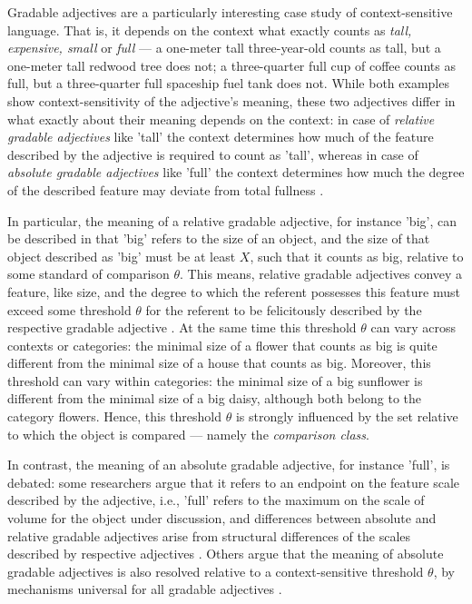 Gradable adjectives are a particularly interesting case study of context-sensitive language. That is, it depends on the context what exactly counts as \textit{tall, expensive, small} or \textit{full} --- a one-meter tall three-year-old counts as tall, but a one-meter tall redwood tree does not; a three-quarter full cup of coffee counts as full, but a three-quarter full spaceship fuel tank does not. While both examples show context-sensitivity of the adjective's meaning, these two adjectives differ in what exactly about their meaning depends on the context: in case of \textit{relative gradable adjectives} like 'tall' the context determines how much of the feature described by the adjective is required to count as 'tall', whereas in case of \textit{absolute gradable adjectives} like 'full' the context determines how much the degree of the described feature may deviate from total fullness \parencite{Aparicio2016, Kennedy2007, hofherr2010adjectives}.  

In particular, the meaning of a relative gradable adjective, for instance 'big', can be described in that 'big' refers to the size of an object, and the size of that object  described as 'big' must be at least $X$, such that it counts as big, relative to some standard of comparison $\theta$. This means, relative gradable adjectives convey a feature, like size, and the degree to which the referent possesses this feature must exceed some threshold $\theta$ for the referent to be felicitously described by the respective gradable adjective \parencite[e.g.,][]{Kennedy2007}. At the same time this threshold $\theta$ can vary across contexts or categories: the minimal size of a flower that counts as big is quite different from the minimal size of a house that counts as big. Moreover, this threshold can vary within categories: the minimal size of a big sunflower is different from the minimal size of a big daisy, although both belong to the category flowers. Hence, this threshold $\theta$ is strongly influenced by the set relative to which the object is compared --- namely the \textit{comparison class}.

In contrast, the meaning of an absolute gradable adjective, for instance 'full', is debated: some researchers argue that it refers to an endpoint on the feature scale described by the adjective, i.e., 'full' refers to the maximum on the scale of volume for the object under discussion, and differences between absolute and relative gradable adjectives arise from structural differences of the scales described by respective adjectives \parencite{Kennedy2007, Aparicio2016, Qing2014}. Others argue that the meaning of absolute gradable adjectives is also resolved relative to a context-sensitive threshold $\theta$, by mechanisms universal for all gradable adjectives \parencite{lassiter2017adjectival}.

